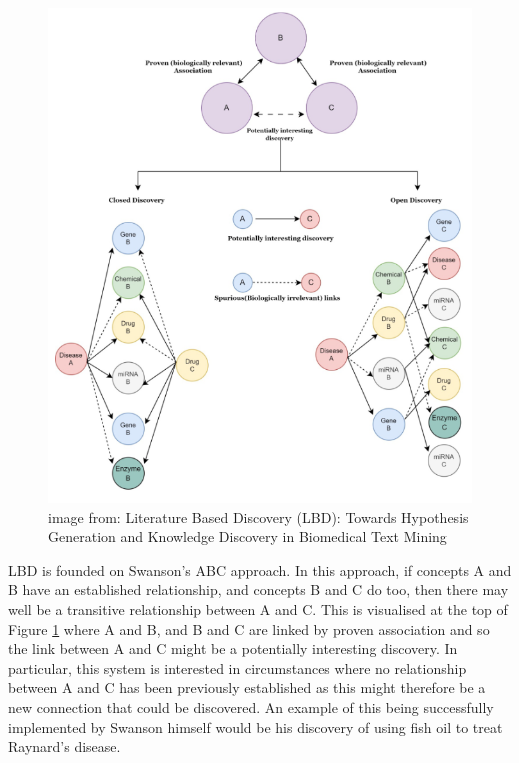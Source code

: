 \documentclass{l4proj}
\begin{document}
\begin{figure}
    \centering
    \includegraphics[width=\linewidth]{images/abc_open_closed.png}
    \caption{image from: Literature Based Discovery (LBD): Towards Hypothesis Generation and Knowledge Discovery in Biomedical Text Mining}
    \label{fig:open_closed}
\end{figure}

LBD is founded on Swanson's ABC approach. In this approach, if concepts A and B have an established relationship, and concepts B and C do too, then there may well be a transitive relationship between A and C. This is visualised at the top of Figure \ref{fig:open_closed} where A and B, and B and C are linked by proven association and so the link between A and C might be a potentially interesting discovery. In particular, this system is interested in circumstances where no relationship between A and C has been previously established as this might therefore be a new connection that could be discovered. An example of this being successfully implemented by Swanson himself would be his discovery of using fish oil to treat Raynard's disease. \\
\end{document}
